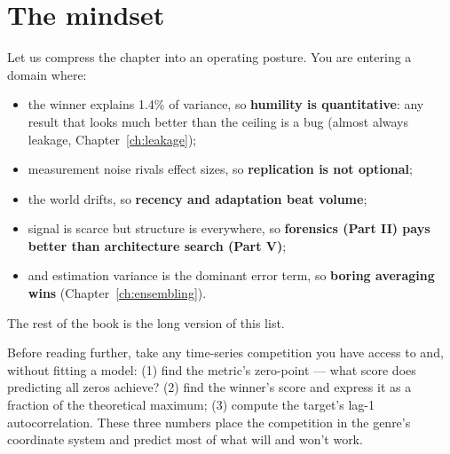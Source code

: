 \section{The mindset}

Let us compress the chapter into an operating posture. You are entering a
domain where:

\begin{itemize}
\item the winner explains 1.4\% of variance, so \textbf{humility is
  quantitative}: any result that looks much better than the ceiling is a bug
  (almost always leakage, Chapter~\ref{ch:leakage});
\item measurement noise rivals effect sizes, so \textbf{replication is not
  optional};
\item the world drifts, so \textbf{recency and adaptation beat volume};
\item signal is scarce but structure is everywhere, so \textbf{forensics
  (Part II) pays better than architecture search (Part V)};
\item and estimation variance is the dominant error term, so
  \textbf{boring averaging wins} (Chapter~\ref{ch:ensembling}).
\end{itemize}

The rest of the book is the long version of this list.

\begin{drillbox}
Before reading further, take any time-series competition you have access to
and, without fitting a model: (1) find the metric's zero-point --- what score
does predicting all zeros achieve? (2) find the winner's score and express it
as a fraction of the theoretical maximum; (3) compute the target's lag-1
autocorrelation. These three numbers place the competition in the genre's
coordinate system and predict most of what will and won't work.
\end{drillbox}
